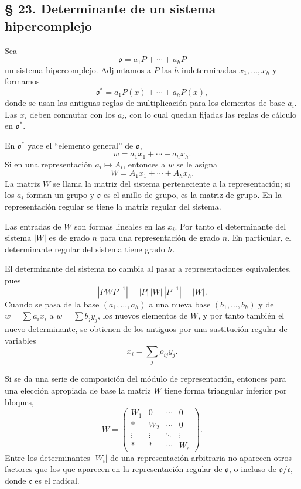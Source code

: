 \documentclass[11pt]{article}
\providecommand{\mo}{\mathfrak{o}}
\providecommand{\mc}{\mathfrak{c}}
\begin{document}
\subsection*{§ 23. Determinante de un sistema hipercomplejo}

Sea
\[
        \mo=a_1P+\cdots+a_hP
\]
un sistema hipercomplejo. Adjuntamos a $P$ las $h$ indeterminadas $x_1,\ldots,x_h$ y formamos
\[
        \mo^*=a_1P(x)+\cdots+a_hP(x),
\]
donde se usan las antiguas reglas de multiplicación para los elementos de base $a_i$. Las $x_i$ deben conmutar con los $a_i$, con lo cual quedan fijadas las reglas de cálculo en $\mo^*$.

En $\mo^*$ yace el ``elemento general'' de $\mo$,
\[
        w=a_1x_1+\cdots+a_hx_h.
\]
Si en una representación $a_i\mapsto A_i$, entonces a $w$ se le asigna
\[
        W=A_1x_1+\cdots+A_hx_h.
\]
La matriz $W$ se llama la matriz del sistema perteneciente a la representación; si los $a_i$ forman un grupo y $\mo$ es el anillo de grupo, es la matriz de grupo. En la representación regular se tiene la matriz regular del sistema.

Las entradas de $W$ son formas lineales en las $x_i$. Por tanto el determinante del sistema $|W|$ es de grado $n$ para una representación de grado $n$. En particular, el determinante regular del sistema tiene grado $h$.

El determinante del sistema no cambia al pasar a representaciones equivalentes, pues
\[
        |PWP^{-1}|=|P|\,|W|\,|P^{-1}|=|W|.
\]
Cuando se pasa de la base $(a_1,\ldots,a_h)$ a una nueva base $(b_1,\ldots,b_h)$ y de $w=\sum a_ix_i$ a $w=\sum b_jy_j$, los nuevos elementos de $W$, y por tanto también el nuevo determinante, se obtienen de los antiguos por una sustitución regular de variables
\[
        x_i=\sum_j \rho_{ij}y_j.
\]

Si se da una serie de composición del módulo de representación, entonces para una elección apropiada de base la matriz $W$ tiene forma triangular inferior por bloques,
\[
        W=\begin{pmatrix}
        W_1&0&\cdots&0\\
        *&W_2&\cdots&0\\
        \vdots&\vdots&\ddots&\vdots\\
        *&*&\cdots&W_s
        \end{pmatrix}.
\]
Entre los determinantes $|W_i|$ de una representación arbitraria no aparecen otros factores que los que aparecen en la representación regular de $\mo$, o incluso de $\mo/\mc$, donde $\mc$ es el radical.
\end{document}
